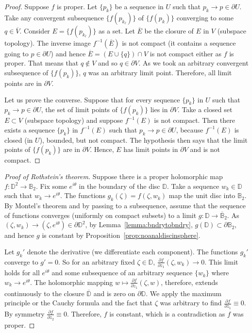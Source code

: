 \documentclass[UTF8,11pt]{ctexart}
\theoremstyle{definition}
\newcommand{\D}{\mathbb D}
\newcommand{\bB}{\mathbb B}
\newcommand{\widebar}[1]{\overline{#1}}
\begin{document}
\begin{proof}
Suppose $f$ is proper. Let $\{p_k\}$ be a sequence in $U$ such that $p_k\to p\in\partial U$. Take any convergent subsequence $\bigl\{f(p_{k_\ell})\bigr\}$ of $\bigl\{f(p_k)\bigr\}$ converging to some $q\in\widebar V$. Consider $E=\bigl\{f(p_{k_\ell})\bigr\}$ as a set. Let $\widebar E$ be the closure of $E$ in $V$ (subspace topology). The inverse image $f^{-1}(\widebar E)$ is not compact (it contains a sequence going to $p\in\partial U$) and hence $\widebar E=(E\cup\{q\})\cap V$ is not compact either as $f$ is proper. That means that $q\notin V$ and so $q\in\partial V$. As we took an arbitrary convergent subsequence of $\bigl\{f(p_k)\bigr\}$, $q$ was an arbitrary limit point. Therefore, all limit points are in $\partial V$.

Let us prove the converse. Suppose that for every sequence $\{p_k\}$ in $U$ such that $p_k\to p\in\partial U$, the set of limit points of $\bigl\{f(p_k)\bigr\}$ lies in $\partial V$. Take a closed set $E\subset V$ (subspace topology) and suppose $f^{-1}(E)$ is not compact. Then there exists a sequence $\{p_k\}$ in $f^{-1}(E)$ such that $p_k\to p\in\partial U$, because $f^{-1}(E)$ is closed (in $U$), bounded, but not compact. The hypothesis then says that the limit points of $\bigl\{f(p_k)\bigr\}$ are in $\partial V$. Hence, $E$ has limit points in $\partial V$ and is not compact.
\end{proof}
\begin{proof}[Proof of Rothstein's theorem]
Suppose there is a proper holomorphic map $f\colon\D^2\to\bB_2$. Fix some $e^{i\theta}$ in the boundary of the disc $\D$. Take a sequence $w_k\in\D$ such that $w_k\to e^{i\theta}$. The functions $g_k(\zeta)=f(\zeta,w_k)$ map the unit disc into $\bB_2$. By Montel's theorem and by passing to a subsequence, assume that the sequence of functions converges (uniformly on compact subsets) to a limit $g\colon\D\to\overline{\bB}_2$. As $(\zeta,w_k)\to(\zeta,e^{i\theta})\in\partial\D^2$, by Lemma~\ref{lemma:bndrytobndry}, $g(\D)\subset\partial\bB_2$, and hence $g$ is constant by Proposition~\ref{prop:noanaldiscinsphere}.

Let $g_k'$ denote the derivative (we differentiate each component). The functions $g_k'$ converge to $g'=0$. So for an arbitrary fixed $\zeta\in\D$, $\frac{\partial f}{\partial z_1}(\zeta,w_k)\to0$. This limit holds for all $e^{i\theta}$ and some subsequence of an arbitrary sequence $\{w_k\}$ where $w_k\to e^{i\theta}$. The holomorphic mapping $w\mapsto\frac{\partial f}{\partial z_1}(\zeta,w)$, therefore, extends continuously to the closure $\widebar\D$ and is zero on $\partial\D$. We apply the maximum principle or the Cauchy formula and the fact that $\zeta$ was arbitrary to find $\frac{\partial f}{\partial z_1}\equiv0$. By symmetry $\frac{\partial f}{\partial z_2}\equiv0$. Therefore, $f$ is constant, which is a contradiction as $f$ was proper.
\end{proof}
\end{document}

